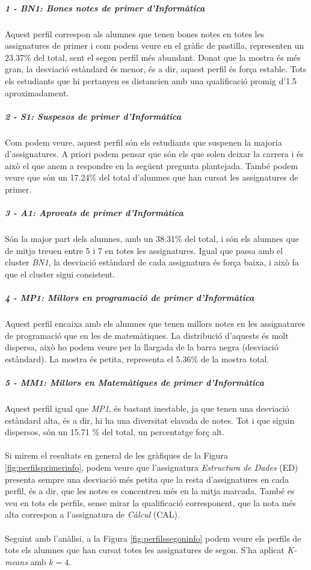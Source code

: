\documentclass[12pt,a4paper,catalan]{article}
\begin{document}
\subparagraph{1 - BN1: Bones notes de primer d'Informàtica}
Aquest perfil correspon als alumnes que tenen bones notes en totes les assignatures de primer i com podem veure en el gràfic de pastilla, representen un 23.37\% del total, sent el segon perfil més abundant. Donat que la mostra és més gran, la desviació estàndard és menor, és a dir, aquest perfil és força estable. Tots els estudiants que hi pertanyen es distancien amb una qualificació promig d'1.5 aproximadament.

\subparagraph{2 - S1: Suspesos de primer d'Informàtica}
Com podem veure, aquest perfil són els estudiants que suspenen la majoria d'assignatures. A priori podem pensar que són els que solen deixar la carrera i és això el que anem a respondre en la següent pregunta plantejada. També podem veure que són un 17.24\% del total d'alumnes que han cursat les assignatures de primer.

\subparagraph{3 - A1: Aprovats de primer d'Informàtica}
Són la major part dels alumnes, amb un 38.31\% del total, i són els alumnes que de mitja treuen entre 5 i 7 en totes les assignatures. Igual que passa amb el cluster \textit{BN1}, la desviació estàndard de cada assignatura és força baixa, i això fa que el cluster sigui consistent.

\subparagraph{4 - MP1: Millors en programació de primer d'Informàtica} 
Aquest perfil encaixa amb els alumnes que tenen millors notes en les assignatures de programació que en les de matemàtiques. La distribució d'aquests és molt dispersa, això ho podem veure per la llargada de la barra negra (desviació estàndard). La mostra és petita, representa el 5.36\% de la mostra total.

\subparagraph{5 - MM1: Millors en Matemàtiques de primer d'Informàtica}
Aquest perfil igual que \textit{MP1}, és bastant inestable, ja que tenen una desviació estàndard alta, és a dir, hi ha una diversitat elavada de notes. Tot i que siguin dispersos, són un 15.71 \% del total, un percentatge forç alt.
\\
\\
Si mirem el resultats en general de les gràfiques de la Figura \ref{fig:perfilsprimerinfo}, podem veure que l'assignatura \textit{Estructura de Dades} (ED) presenta sempre una desviació més petita que la resta d'assignatures en cada perfil, és a dir, que les notes es concentren més en la mitja marcada. També es veu en tots els perfils, sense mirar la qualificació corresponent, que la nota més alta correspon a l'assignatura de \textit{Càlcul} (CAL).
\\
\\
Seguint amb l'anàlisi, a la Figura \ref{fig:perfilssegoninfo} podem veure els perfils de tots els alumnes que han cursat totes les assignatures de segon. S'ha aplicat \textit{K-means} amb $k=4$.
\end{document}
